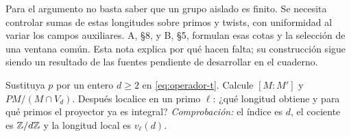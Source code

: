 Para el argumento no basta saber que un grupo aislado es finito. Se
necesita controlar sumas de estas longitudes sobre primos y twists, con
uniformidad al variar los campos auxiliares. A, §8, y B, §5, formulan
esas cotas y la selección de una ventana común. Esta nota explica por
qué hacen falta; su construcción sigue siendo un resultado de las fuentes
pendiente de desarrollar en el cuaderno.

\begin{ejercicio}
Sustituya $p$ por un entero $d\ge2$ en \eqref{eq:operador-t}.
Calcule $[M:M']$ y $PM/(M\cap V_d)$. Después localice en un primo
$\ell$: ¿qué longitud obtiene y para qué primos el proyector ya es integral?
\emph{Comprobación:} el índice es $d$, el cociente es $\mathbb{Z}/d\mathbb{Z}$ y la
longitud local es $v_\ell(d)$.
\end{ejercicio}
